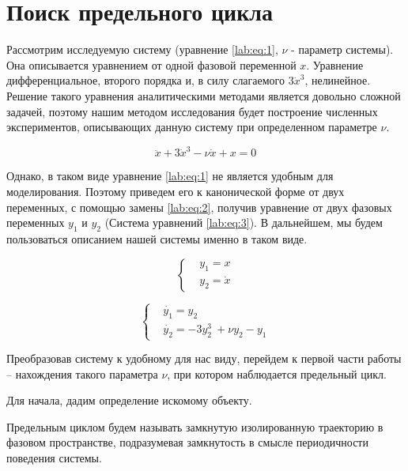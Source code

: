 \chapter{Поиск предельного цикла}

Рассмотрим исследуемую систему (уравнение \eqref{lab:eq:1},
$\nu$ - параметр системы). Она описывается
уравнением от одной фазовой переменной $x$. Уравнение дифференциальное, второго
порядка и, в силу слагаемого $3\dot{x}^3$, нелинейное. Решение такого уравнения
аналитическими методами является довольно сложной задачей, поэтому нашим
методом исследования будет построение численных экспериментов, описывающих
данную систему при определенном параметре $\nu$.

\begin{equation}\label{lab:eq:1}
  \ddot{x} + 3 \dot{x}^3 - \nu\dot{x} + x = 0
\end{equation}

Однако, в таком виде уравнение \eqref{lab:eq:1} не является удобным для
моделирования. Поэтому приведем его к канонической форме от двух переменных, с
помощью замены \eqref{lab:eq:2}, получив уравнение от двух фазовых переменных
$y_1$ и $y_2$ (Система уравнений \eqref{lab:eq:3}). В дальнейшем, мы будем
пользоваться описанием нашей системы именно в таком виде.

\begin{equation}\label{lab:eq:2}
  \begin{cases}
    &y_1 = x \\
    &y_2 = \dot{x}
  \end{cases}
\end{equation}

\begin{equation}\label{lab:eq:3}
  \begin{cases}
    &\dot{y_1} = y_2 \\
    &\dot{y_2} = -3y_2^3\ + \nu y_2 - y_1
  \end{cases}
\end{equation}

Преобразовав систему к удобному для нас виду, перейдем к первой части работы --
нахождения такого параметра $\nu$, при котором наблюдается предельный цикл.

Для начала, дадим определение искомому объекту.

\begin{definition}\label{lab:def:cycle}
  Предельным циклом будем называть замкнутую изолированную траекторию
  в фазовом пространстве, подразумевая замкнутость в смысле периодичности
  поведения системы.
\end{definition}

